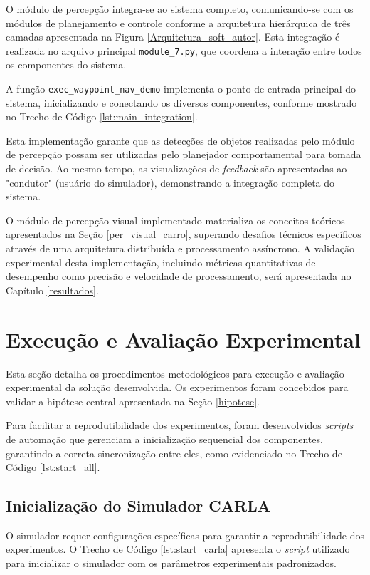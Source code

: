 O módulo de percepção integra-se ao sistema completo, comunicando-se com os módulos de planejamento e controle conforme a arquitetura hierárquica de três camadas apresentada na Figura \ref{Arquitetura_soft_autor}. Esta integração é realizada no arquivo principal \texttt{module\_7.py}, que coordena a interação entre todos os componentes do sistema.

A função \texttt{exec\_waypoint\_nav\_demo} implementa o ponto de entrada principal do sistema, inicializando e conectando os diversos componentes, conforme mostrado no Trecho de Código \ref{lst:main_integration}.

Esta implementação garante que as detecções de objetos realizadas pelo módulo de percepção possam ser utilizadas pelo planejador comportamental para tomada de decisão. Ao mesmo tempo, as visualizações de \textit{feedback} são apresentadas ao "condutor" (usuário do simulador), demonstrando a integração completa do sistema.

O módulo de percepção visual implementado materializa os conceitos teóricos apresentados na Seção \ref{per_visual_carro}, superando desafios técnicos específicos através de uma arquitetura distribuída e processamento assíncrono. A validação experimental desta implementação, incluindo métricas quantitativas de desempenho como precisão e velocidade de processamento, será apresentada no Capítulo \ref{resultados}.

\section{Execução e Avaliação Experimental} \label{executando_a_solucao}

Esta seção detalha os procedimentos metodológicos para execução e avaliação experimental da solução desenvolvida. Os experimentos foram concebidos para validar a hipótese central apresentada na Seção \ref{hipotese}.

Para facilitar a reprodutibilidade dos experimentos, foram desenvolvidos \textit{scripts} de automação que gerenciam a inicialização sequencial dos componentes, garantindo a correta sincronização entre eles, como evidenciado no Trecho de Código \ref{lst:start_all}.

\subsection{Inicialização do Simulador CARLA}

O simulador requer configurações específicas para garantir a reprodutibilidade dos experimentos. O Trecho de Código \ref{lst:start_carla} apresenta o \textit{script} utilizado para inicializar o simulador com os parâmetros experimentais padronizados.

